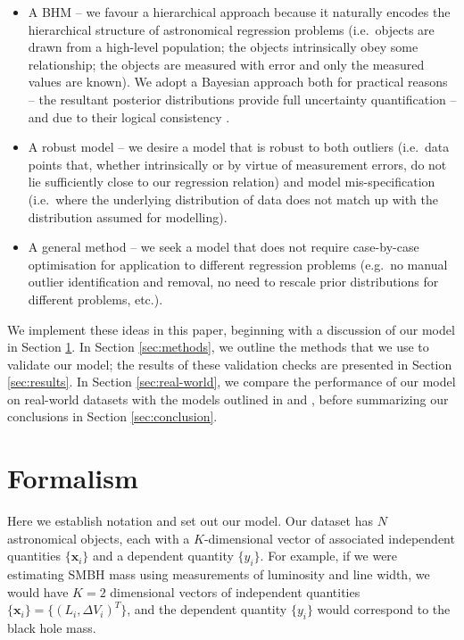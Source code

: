 \documentclass[fleqn,usenatbib]{rasti}
\begin{document}
\begin{itemize}
	\item A BHM -- we favour a hierarchical approach
	because it naturally encodes the hierarchical structure of astronomical
	regression problems (i.e.\ objects are drawn from a high-level population;
	the objects intrinsically obey some relationship; the objects are measured
	with error and only the measured values are known). We adopt a Bayesian
	approach both for practical reasons -- the resultant posterior distributions provide full uncertainty quantification -- and due to their logical consistency \citep[e.g.][]{Cox:1946, van_Horn:2003, Knuth:2010}.

	\item A robust model -- we desire a model that is robust to both outliers
	(i.e.\ data points that, whether intrinsically or by virtue of measurement
	errors, do not lie sufficiently close to our regression relation) and model
	mis-specification (i.e.\ where the underlying distribution of data does not
	match up with the distribution assumed for modelling).

	\item A general method -- we seek a model that does not require case-by-case
	optimisation for application to different regression problems (e.g.\ no
	manual outlier identification and removal, no need to rescale prior
	distributions for different problems, etc.).
\end{itemize}

We implement these ideas in this paper, beginning with a discussion of our model
in Section \ref{sec:formalism}. In Section \ref{sec:methods}, we outline the
methods that we use to validate our model; the results of these validation
checks are presented in Section \ref{sec:results}. In Section
\ref{sec:real-world}, we compare the performance of our model on real-world
datasets with the models outlined in \citet{Kelly:2007} and \citet{Park:2017},
before summarizing our conclusions in Section \ref{sec:conclusion}.

\section{Formalism}
\label{sec:formalism}

Here we establish notation and set out our model. Our dataset has $N$
astronomical objects, each with a $K$-dimensional vector of associated
independent quantities $\{\boldsymbol{x}_i\}$ and a dependent quantity
$\{y_i\}$. For example, if we were estimating SMBH mass
using measurements of luminosity and line width, we would have $K = 2$
dimensional vectors of independent quantities $\{\boldsymbol{x}_i\} = \{(L_i, \Delta V_i)^T\}$, and the dependent quantity $\{y_i\}$ would
correspond to the black hole mass.
\end{document}
